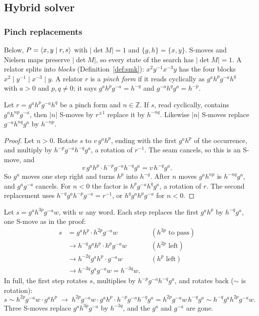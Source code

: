 \subsection{Hybrid solver}\label{app:hybrid}

\subsubsection{Pinch replacements}\label{sec:pinch}

Below, $P=\langle x,y \mid r,s \rangle$ with $|\det M|=1$ and $\{g,h\}=\{x,y\}$. S-moves and Nielsen maps preserve $|\det M|$, so
every state of the search has $|\det M|=1$. A relator splits into \emph{blocks} (Definition~\ref{def:smk}):
$x^2y^{-1}x^{-3}y$ has the four blocks $x^2\mid y^{-1}\mid x^{-3}\mid y$. A relator $r$ is a \emph{pinch form} if it
reads cyclically as $g^ah^pg^{-a}h^q$ with $a>0$ and $p,q\neq0$; it says $g^ah^pg^{-a}=h^{-q}$ and
$g^{-a}h^qg^a=h^{-p}$.

\begin{lemma}\label{lem:pinch}
Let $r=g^ah^pg^{-a}h^q$ be a pinch form and $n\in\mathbb Z$. If $s$, read cyclically, contains $g^ah^{np}g^{-a}$, then
$|n|$ S-moves by $r^{\pm1}$ replace it by $h^{-nq}$. Likewise $|n|$ S-moves replace $g^{-a}h^{nq}g^a$ by $h^{-np}$.
\end{lemma}

\begin{proof}
Let $n>0$. Rotate $s$ to $v\,g^ah^p$, ending with the first $g^ah^p$ of the occurrence, and multiply by
$h^{-p}g^{-a}h^{-q}g^a$, a rotation of $r^{-1}$. The seam cancels, so this is an S-move, and
\[
v\,g^ah^p\cdot h^{-p}g^{-a}h^{-q}g^a=v\,h^{-q}g^a .
\]
So $g^a$ moves one step right and turns $h^p$ into $h^{-q}$. After $n$ moves $g^ah^{np}$ is $h^{-nq}g^a$, and
$g^ag^{-a}$ cancels. For $n<0$ the factor is $h^pg^{-a}h^qg^a$, a rotation of $r$. The second replacement uses
$h^{-q}g^ah^{-p}g^{-a}=r^{-1}$, or $h^qg^ah^pg^{-a}$ for $n<0$.
\end{proof}

\begin{example}\label{ex:replace}
Let $s=g^ah^{3p}g^{-a}w$, with $w$ any word. Each step replaces the first $g^ah^p$ by $h^{-q}g^a$, one S-move as in
the proof:
\begin{align*}
s&=g^ah^p\cdot h^{2p}g^{-a}w &&(h^{3p}\text{ to pass})\\
&\to h^{-q}g^ah^p\cdot h^{p}g^{-a}w &&(h^{2p}\text{ left})\\
&\to h^{-2q}g^ah^p\cdot g^{-a}w &&(h^{p}\text{ left})\\
&\to h^{-3q}g^ag^{-a}w=h^{-3q}w.
\end{align*}
In full, the first step rotates $s$, multiplies by $h^{-p}g^{-a}h^{-q}g^a$, and rotates back ($\sim$ is rotation):
\[
s\sim h^{2p}g^{-a}w\cdot g^ah^p\;\to\;h^{2p}g^{-a}w\cdot g^ah^p\cdot h^{-p}g^{-a}h^{-q}g^a=h^{2p}g^{-a}w\,h^{-q}g^a
\sim h^{-q}g^ah^{2p}g^{-a}w.
\]
Three S-moves replace $g^ah^{3p}g^{-a}$ by $h^{-3q}$, and the $g^a$ and $g^{-a}$ are gone.
\end{example}

